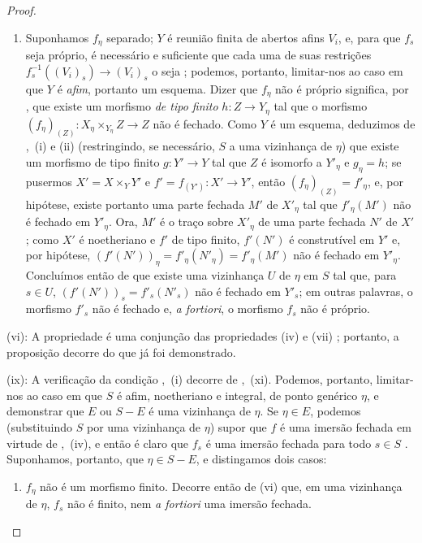 \begin{proof}
\begin{enumerate}[label=\upshape{$\arabic{enumi}^\circ$}]
  \item Suponhamos $f_\eta$ separado; $Y$ é reunião finita de abertos afins $V_i$, e, para que $f_s$ seja próprio, é necessário e suficiente que cada uma de suas restrições $f_s^{-1}((V_i)_s)\to(V_i)_s$ o seja ; podemos, portanto, limitar-nos ao caso em que $Y$ é \emph{afim}, portanto um esquema.
  Dizer que $f_\eta$ não é próprio significa, por , que existe um morfismo \emph{de tipo finito} $h:Z\to Y_\eta$ tal que o morfismo $(f_\eta)_{(Z)}:X_\eta\times_{Y_\eta} Z\to Z$ não é fechado.
  Como $Y$ é um esquema, deduzimos de ,~(i) e (ii) (restringindo, se necessário, $S$ a uma vizinhança de $\eta$) que existe um morfismo de tipo finito $g:Y'\to Y$ tal que $Z$ é isomorfo a $Y'_\eta$ e $g_\eta=h$;
  se pusermos $X'=X\times_Y Y'$ e $f'=f_{(Y')}:X'\to Y'$, então $(f_\eta)_{(Z)}=f'_\eta$, e, por hipótese, existe portanto uma parte fechada $M'$ de $X'_\eta$ tal que $f'_\eta(M')$ não é fechado em $Y'_\eta$.
  Ora, $M'$ é o traço sobre $X'_\eta$ de uma parte fechada $N'$ de $X'$; como $X'$ é noetheriano e $f'$ de tipo finito, $f'(N')$ é construtível em $Y'$  e, por hipótese, $(f'(N'))_\eta=f'_\eta(N'_\eta)=f'_\eta(M')$ não é fechado em $Y'_\eta$.
  Concluímos então de  que existe uma vizinhança $U$ de $\eta$ em $S$ tal que, para $s\in U$, $(f'(N'))_s=f'_s(N'_s)$ não é fechado em $Y'_s$; em outras palavras, o morfismo $f'_s$ não é fechado e, \emph{a fortiori}, o morfismo $f_s$ não é próprio.
\end{enumerate}

(vi): A propriedade é uma conjunção das propriedades (iv) e (vii) ; portanto, a proposição decorre do que já foi demonstrado.

(ix): A verificação da condição ,~(i) decorre de ,~(xi).
Podemos, portanto, limitar-nos ao caso em que $S$ é afim, noetheriano e integral, de ponto genérico $\eta$, e demonstrar que $E$ ou $S-E$ é uma vizinhança de $\eta$.
Se $\eta\in E$, podemos (substituindo $S$ por uma vizinhança de $\eta$) supor que $f$ é uma imersão fechada em virtude de ,~(iv), e então é claro que $f_s$ é uma imersão fechada para todo $s\in S$ .
Suponhamos, portanto, que $\eta\in S-E$, e distingamos dois casos:
\begin{enumerate}[label=\upshape{$\arabic{enumi}^\circ$}]
  \item $f_\eta$ não é um morfismo finito.
  Decorre então de (vi) que, em uma vizinhança de $\eta$, $f_s$ não é finito, nem \emph{a fortiori} uma imersão fechada.


\end{enumerate}
\end{proof}
